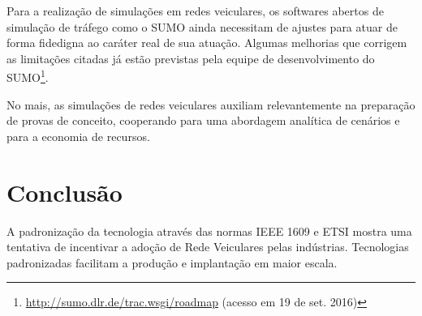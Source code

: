 \documentclass[
12pt,				%
openright,			%
oneside,			%
a4paper,			%
brazil,				%
]{abntex2}
\begin{document}
	\par Para a realização de simulações em redes veiculares, os softwares abertos de simulação de tráfego como o SUMO ainda necessitam de ajustes para atuar de forma fidedigna ao caráter real de sua atuação. Algumas melhorias que corrigem as limitações citadas já estão previstas pela equipe de desenvolvimento do SUMO{\footnote{\href{http://sumo.dlr.de/trac.wsgi/roadmap}{http://sumo.dlr.de/trac.wsgi/roadmap} (acesso em 19 de set. 2016)}}.
		
	\par No mais, as simulações de redes veiculares auxiliam relevantemente na preparação de provas de conceito, cooperando para uma abordagem analítica de cenários e para a economia de recursos.
	


	\chapter*[Conclusão]{Conclusão}

	\par A padronização da tecnologia através das normas IEEE 1609 e ETSI mostra uma tentativa de incentivar a adoção de Rede Veiculares pelas indústrias. Tecnologias padronizadas facilitam a produção e implantação em maior escala.
\end{document}
